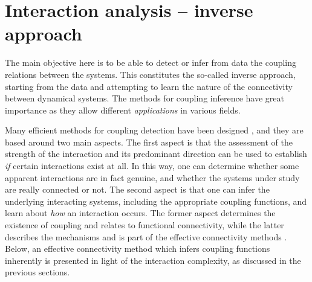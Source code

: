 \documentclass[pre,aps,twocolumn,showpacs]{revtex4}
\begin{document}
\section{Interaction analysis -- inverse approach}

The main objective here is to be able to detect or infer from data the coupling relations between the systems. This constitutes the so-called inverse approach, starting from the data and attempting to learn the nature of the connectivity between  dynamical systems. The methods for coupling inference have great importance as they allow different \emph{applications} in various fields. %

Many efficient methods for coupling detection have been designed  \cite{Smirnov:09,Andrzejak:06a,Palus:03a,Bahraminasab:08,Jamsek:10,Hlavackova:07,Faes:11,
Stankovski:12b,Kralemann:08,Kiss:05,Tokuda:07}, and they are based around two main aspects. The first aspect is that the assessment of the strength of the interaction and its predominant direction can be used to establish \emph{if} certain interactions exist at all. In this way, one can determine whether some apparent interactions are in fact genuine, and whether the systems under study are really connected or not. The second aspect is that one can infer the underlying interacting systems, including the appropriate coupling functions, and learn about \emph{how} an interaction occurs. The former aspect determines the existence of coupling and relates to functional connectivity, while the latter describes the mechanisms and is part of the effective connectivity methods \cite{Friston:11}. Below, an effective connectivity method which infers coupling functions inherently is presented in light of the interaction complexity, as discussed in the previous sections.
\end{document}
